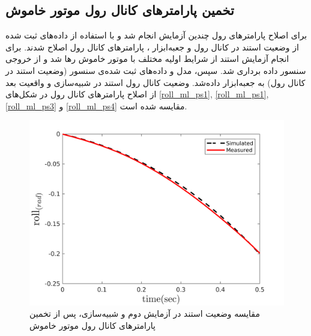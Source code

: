 \subsection{تخمین پارامترهای کانال رول موتور خاموش}
برای اصلاح پارامترهای رول چندین آزمایش انجام شد و با استفاده از داده‌های ثبت شده از وضعیت استند در کانال رول و جعبه‌ابزار
،
پارامترهای کانال رول اصلاح شدند.
برای انجام آزمایش استند از شرایط اولیه مختلف با موتور خاموش رها شد  و از خروجی سنسور داده برداری شد. سپس، مدل و داده‌های ثبت شده‌ی سنسور (وضعیت استند در کانال رول) به جعبه‌ابزار
داده‌شد. وضعیت کانال رول استند در شبیه‌سازی و واقعیت بعد از اصلاح پارامترهای کانال رول در شکل‌های
\ref{roll_ml_ps1}, \ref{roll_ml_ps1}, \ref{roll_ml_ps3} و \ref{roll_ml_ps4}
مقایسه شده است.

\begin{figure}[H]
	\includegraphics[width=.48\linewidth]{../Figures/RCP/roll_ml_parameter_estimation/RCP_roll_S2.png}
	\centering
	\caption{مقايسه وضعیت استند در  آزمايش دوم و شبیه‌سازی، پس از تخمین پارامترهای کانال رول موتور خاموش}
	\label{roll_ml_ps2}
\end{figure}
